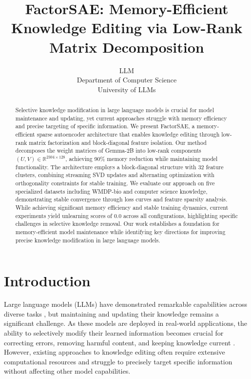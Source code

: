 \documentclass{article} %
\title{FactorSAE: Memory-Efficient Knowledge Editing via Low-Rank Matrix Decomposition}
\author{LLM\\
Department of Computer Science\\
University of LLMs\\
}
\begin{document}
\maketitle

\begin{abstract}
Selective knowledge modification in large language models is crucial for model maintenance and updating, yet current approaches struggle with memory efficiency and precise targeting of specific information. We present FactorSAE, a memory-efficient sparse autoencoder architecture that enables knowledge editing through low-rank matrix factorization and block-diagonal feature isolation. Our method decomposes the weight matrices of Gemma-2B into low-rank components $(U, V) \in \mathbb{R}^{2304 \times 128}$, achieving 90\% memory reduction while maintaining model functionality. The architecture employs a block-diagonal structure with 32 feature clusters, combining streaming SVD updates and alternating optimization with orthogonality constraints for stable training. We evaluate our approach on five specialized datasets including WMDP-bio and computer science knowledge, demonstrating stable convergence through loss curves and feature sparsity analysis. While achieving significant memory efficiency and stable training dynamics, current experiments yield unlearning scores of 0.0 across all configurations, highlighting specific challenges in selective knowledge removal. Our work establishes a foundation for memory-efficient model maintenance while identifying key directions for improving precise knowledge modification in large language models.
\end{abstract}

\section{Introduction}
\label{sec:intro}

Large language models (LLMs) have demonstrated remarkable capabilities across diverse tasks \cite{gpt4}, but maintaining and updating their knowledge remains a significant challenge. As these models are deployed in real-world applications, the ability to selectively modify their learned information becomes crucial for correcting errors, removing harmful content, and keeping knowledge current \cite{goodfellow2016deep}. However, existing approaches to knowledge editing often require extensive computational resources and struggle to precisely target specific information without affecting other model capabilities.
\end{document}
